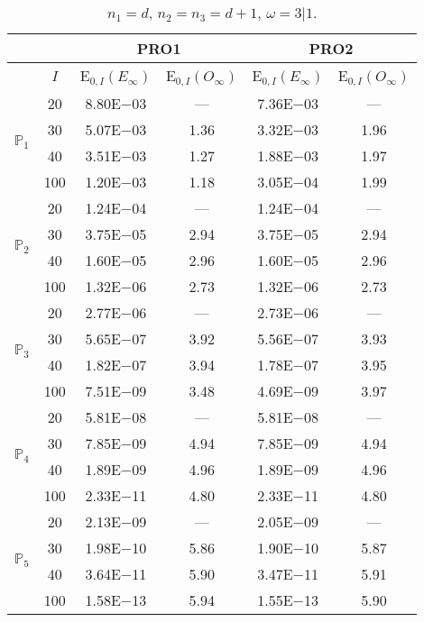 \begin{table}[H]
\caption{$n_1=d$, $n_2=n_3=d+1$, $\omega=3|1$.}
\setlength{\tabcolsep}{5pt}
\centering
\begin{tabular}{@{}l c c c c c@{}}
\toprule
 &  & \multicolumn{2}{c}{PRO1} & \multicolumn{2}{c}{PRO2}\\
\midrule
 & $I$ & E$_{0,I}(E_{\infty})$ & E$_{0,I}(O_{\infty})$ & E$_{0,I}(E_{\infty})$ & E$_{0,I}(O_{\infty})$\\
\midrule
\multirow{4}{*}{$\mathbb{P}_{1}$}
 & 20 & 8.80E$-$03 & --- & 7.36E$-$03 & ---\\
 & 30 & 5.07E$-$03 & 1.36 & 3.32E$-$03 & 1.96 \\
 & 40 & 3.51E$-$03 & 1.27 & 1.88E$-$03 & 1.97 \\
 & 100 & 1.20E$-$03 & 1.18 & 3.05E$-$04 & 1.99 \\
\midrule
\multirow{4}{*}{$\mathbb{P}_{2}$}
 & 20 & 1.24E$-$04 & --- & 1.24E$-$04 & ---\\
 & 30 & 3.75E$-$05 & 2.94 & 3.75E$-$05 & 2.94 \\
 & 40 & 1.60E$-$05 & 2.96 & 1.60E$-$05 & 2.96 \\
 & 100 & 1.32E$-$06 & 2.73 & 1.32E$-$06 & 2.73 \\
\midrule
\multirow{4}{*}{$\mathbb{P}_{3}$}
 & 20 & 2.77E$-$06 & --- & 2.73E$-$06 & ---\\
 & 30 & 5.65E$-$07 & 3.92 & 5.56E$-$07 & 3.93 \\
 & 40 & 1.82E$-$07 & 3.94 & 1.78E$-$07 & 3.95 \\
 & 100 & 7.51E$-$09 & 3.48 & 4.69E$-$09 & 3.97 \\
\midrule
\multirow{4}{*}{$\mathbb{P}_{4}$}
 & 20 & 5.81E$-$08 & --- & 5.81E$-$08 & ---\\
 & 30 & 7.85E$-$09 & 4.94 & 7.85E$-$09 & 4.94 \\
 & 40 & 1.89E$-$09 & 4.96 & 1.89E$-$09 & 4.96 \\
 & 100 & 2.33E$-$11 & 4.80 & 2.33E$-$11 & 4.80 \\
\midrule
\multirow{4}{*}{$\mathbb{P}_{5}$}
 & 20 & 2.13E$-$09 & --- & 2.05E$-$09 & ---\\
 & 30 & 1.98E$-$10 & 5.86 & 1.90E$-$10 & 5.87 \\
 & 40 & 3.64E$-$11 & 5.90 & 3.47E$-$11 & 5.91 \\
 & 100 & 1.58E$-$13 & 5.94 & 1.55E$-$13 & 5.90 \\
\bottomrule
\end{tabular}
\label{Table:PRO:Rodrigo:Test4}
\end{table}
